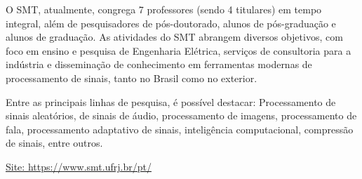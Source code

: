         	O SMT, atualmente, congrega 7 professores (sendo 4 titulares) em tempo integral, além de pesquisadores de pós-doutorado, alunos de pós-graduação e alunos de graduação. As atividades do SMT abrangem diversos objetivos, com foco em ensino e pesquisa de Engenharia Elétrica, serviços de consultoria para a indústria e disseminação de conhecimento em ferramentas modernas de processamento de sinais, tanto no Brasil como no exterior.

        	Entre as principais linhas de pesquisa, é possível destacar: Processamento de sinais aleatórios, de sinais de áudio, processamento de imagens, processamento de fala, processamento adaptativo de sinais, inteligência computacional, compressão de sinais, entre outros.

        \href{https://www.smt.ufrj.br/pt/}{Site: https://www.smt.ufrj.br/pt/}